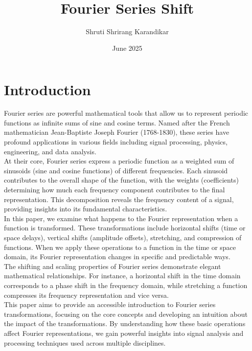 \documentclass{article}
\title{Fourier Series Shift}
\author{Shruti Shrirang Karandikar}
\date{June 2025}
\begin{document}
\maketitle

\section{Introduction}
Fourier series are powerful mathematical tools that allow us to represent periodic functions as infinite sums of sine and cosine terms. Named after the French mathematician Jean-Baptiste Joseph Fourier (1768-1830), these series have profound applications in various fields including signal processing, physics, engineering, and data analysis.\\

At their core, Fourier series express a periodic function as a weighted sum of sinusoids (sine and cosine functions) of different frequencies. Each sinusoid contributes to the overall shape of the function, with the weights (coefficients) determining how much each frequency component contributes to the final representation. This decomposition reveals the frequency content of a signal, providing insights into its fundamental characteristics.\\

In this paper, we examine what happens to the Fourier representation when a function is transformed. These transformations include horizontal shifts (time or space delays), vertical shifts (amplitude offsets), stretching, and compression of functions. When we apply these operations to a function in the time or space domain, its Fourier representation changes in specific and predictable ways.\\

The shifting and scaling properties of Fourier series demonstrate elegant mathematical relationships. For instance, a horizontal shift in the time domain corresponds to a phase shift in the frequency domain, while stretching a function compresses its frequency representation and vice versa.\\

This paper aims to provide an accessible introduction to Fourier series transformations, focusing on the core concepts and developing an intuition about the impact of the transformations. By understanding how these basic operations affect Fourier representations, we gain powerful insights into signal analysis and processing techniques used across multiple disciplines.\\
\end{document}

